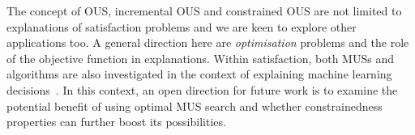The concept of OUS, incremental OUS and constrained OUS are not limited to explanations of satisfaction problems and we are keen to explore other applications too.
A general direction here are \textit{optimisation} problems and the role of the objective function in explanations.
Within satisfaction, both MUSs and \hitsetbased algorithms are also investigated in the context of explaining machine learning decisions~\cite{ignatiev2019abduction}. 
In this context, an open direction for future work is to examine the potential benefit of using optimal MUS search and whether constrainedness properties can further boost its possibilities.
